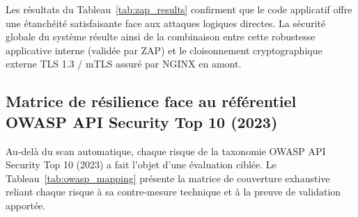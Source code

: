 Les résultats du Tableau~\ref{tab:zap_results} confirment que le code applicatif offre une étanchéité satisfaisante face aux attaques logiques directes. La sécurité globale du système résulte ainsi de la combinaison entre cette robustesse applicative interne (validée par ZAP) et le cloisonnement cryptographique externe TLS 1.3 / mTLS assuré par NGINX en amont.

\subsection{Matrice de résilience face au référentiel OWASP API Security Top 10 (2023)}
Au-delà du scan automatique, chaque risque de la taxonomie OWASP API Security Top 10 (2023) \cite{owasp2023} a fait l'objet d'une évaluation ciblée. Le Tableau~\ref{tab:owasp_mapping} présente la matrice de couverture exhaustive reliant chaque risque à sa contre-mesure technique et à la preuve de validation apportée.

